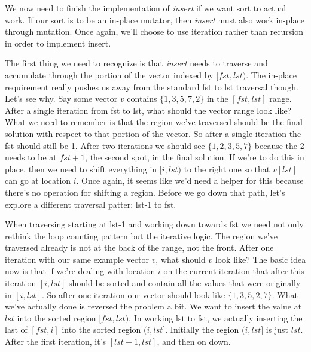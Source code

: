 \documentclass[]{tufte-handout}
\begin{document}
We now need to finish the implementation of \textit{insert} if we want sort to actual work. If our sort is to be an in-place mutator, then \textit{insert} must also work in-place through mutation. Once again, we'll choose to use iteration rather than recursion in order to implement insert. 

The first thing we need to recognize is that \textit{insert} needs to traverse and accumulate through the portion of the vector indexed by $[fst,lst)$. The in-place requirement really pushes us away from the standard fst to lst traversal though. Let's see why. Say some vector $v$ contains $\{1,3,5,7,2\}$ in the $[fst,lst]$ range. After a single iteration from fst to lst, what should the vector range look like? What we need to remember is that the region we've traversed should be the final solution with respect to that portion of the vector. So after a single iteration the fst should still be 1. After two iterations we should see $\{1,2,3,5,7\}$ because the 2 needs to be at $fst+1$, the second spot, in the final solution. If we're to do this in place, then we need to shift everything in $[i,lst)$ to the right one so that $v[lst]$ can go at location $i$.  Once again, it seems like we'd need a helper for this because there's no operation for shifting a region. Before we go down that path, let's explore a different traversal patter: lst-1 to fst. 

When traversing starting at lst-1 and working down towards fst we need not only rethink the loop counting pattern but the iterative logic. The region we've traversed already is not at the back of the range, not the front. After one iteration with our same example vector $v$, what should $v$ look like? The basic idea now is that if we're dealing with location $i$ on the current iteration that after this iteration $[i,lst]$ should be sorted and contain all the values that were originally in $[i,lst]$. So after one iteration our vector should look like $\{1,3,5,2,7\}$. What we've actually done is reversed the problem a bit. We want to insert the value at $lst$ into the sorted region $[fst,lst)$.  In working lst to fst, we actually inserting the last of $[fst,i]$ into the sorted region $(i,lst]$. Initially the region $(i,lst]$ is just $lst$. After the first iteration, it's $[lst-1,lst]$, and then on down.  
\end{document}
